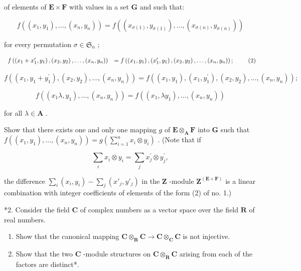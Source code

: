 of elements of \(\mathbf{E} \times \mathbf{F}\) with values in a set \(\mathbf{G}\) and such that:

\[
f ((x _ {1}, y _ {1}), \dots , (x _ {n}, y _ {n})) = f ((x _ {\sigma (1)}, y _ {\sigma (1)}), \dots , (x _ {\sigma (n)}, y _ {\sigma (n)}))\tag{1}
\]

for every permutation \(\sigma \in \mathfrak{S}_n\) ;

\[
\begin{array}{r l} f \left(\left(x _ {1} + x _ {1} ^ {\prime}, y _ {1}\right), \left(x _ {2}, y _ {2}\right), \dots , \left(x _ {n}, y _ {n}\right)\right) & = f \left(\left(x _ {1}, y _ {1}\right), \left(x _ {1} ^ {\prime}, y _ {1}\right), \left(x _ {2}, y _ {2}\right), \dots , \left(x _ {n}, y _ {n}\right)\right); \end{array} \tag {2}
\]

\[
f ((x _ {1}, y _ {1} + y _ {1} ^ {\prime}), (x _ {2}, y _ {2}), \dots , (x _ {n}, y _ {n})) = f ((x _ {1}, y _ {1}), (x _ {1}, y _ {1} ^ {\prime}), (x _ {2}, y _ {2}), \dots , (x _ {n}, y _ {n}));\tag{3}
\]

\[
f ((x _ {1} \lambda , y _ {1}), \dots , (x _ {n}, y _ {n})) = f ((x _ {1}, \lambda y _ {1}), \dots , (x _ {n}, y _ {n}))\tag{4}
\]

for all \(\lambda \in \mathbf{A}\) .

Show that there exists one and only one mapping \(g\) of \(\mathbf{E} \otimes_{\mathbf{A}} \mathbf{F}\) into \(\mathbf{G}\) such that \(f((x_1, y_1), \ldots, (x_n, y_n)) = g\left(\sum_{i=1}^{n} x_i \otimes y_i\right)\) . (Note that if

\[
\sum_ {i} x _ {i} \otimes y _ {i} = \sum_ {j} x _ {j} ^ {\prime} \otimes y _ {j} ^ {\prime},
\]

the difference \(\sum_{i}(x_i, y_i) - \sum_j(x'_j, y'_j)\) in the \(\mathbf{Z}\) -module \(\mathbf{Z}^{(\mathbf{E} \times \mathbf{F})}\) is a linear combination with integer coefficients of elements of the form (2) of no. 1.)

*2. Consider the field \(\mathbf{C}\) of complex numbers as a vector space over the field \(\mathbf{R}\) of real numbers.

\begin{enumerate}
\def\labelenumi{(\alph{enumi})}
\item
  Show that the canonical mapping \(\mathbf{C} \otimes_{\mathbf{R}} \mathbf{C} \to \mathbf{C} \otimes_{\mathbf{C}} \mathbf{C}\) is not injective.
\item
  Show that the two \(\mathbf{C}\) -module structures on \(\mathbf{C} \otimes_{\mathbf{R}} \mathbf{C}\) arising from each of the factors are distinct*.
\end{enumerate}

